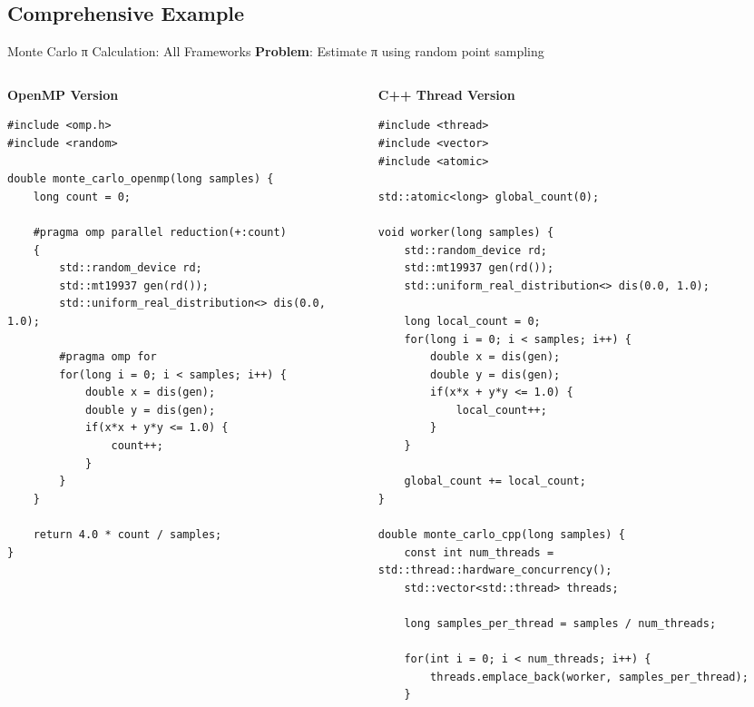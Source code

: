 \subsection{Comprehensive Example}
\begin{frame}[fragile]{ Monte Carlo π Calculation: All Frameworks}
	\textbf{Problem}: Estimate π using random point sampling

	\begin{columns}
		\begin{column}{0.3\textwidth}
			\textbf{OpenMP Version}
			\begin{verbatim}
#include <omp.h>
#include <random>

double monte_carlo_openmp(long samples) {
    long count = 0;

    #pragma omp parallel reduction(+:count)
    {
        std::random_device rd;
        std::mt19937 gen(rd());
        std::uniform_real_distribution<> dis(0.0, 1.0);

        #pragma omp for
        for(long i = 0; i < samples; i++) {
            double x = dis(gen);
            double y = dis(gen);
            if(x*x + y*y <= 1.0) {
                count++;
            }
        }
    }

    return 4.0 * count / samples;
}
			\end{verbatim}
		\end{column}
		\begin{column}{0.35\textwidth}
			\textbf{C++ Thread Version}
			\begin{verbatim}
#include <thread>
#include <vector>
#include <atomic>

std::atomic<long> global_count(0);

void worker(long samples) {
    std::random_device rd;
    std::mt19937 gen(rd());
    std::uniform_real_distribution<> dis(0.0, 1.0);

    long local_count = 0;
    for(long i = 0; i < samples; i++) {
        double x = dis(gen);
        double y = dis(gen);
        if(x*x + y*y <= 1.0) {
            local_count++;
        }
    }

    global_count += local_count;
}

double monte_carlo_cpp(long samples) {
    const int num_threads = std::thread::hardware_concurrency();
    std::vector<std::thread> threads;

    long samples_per_thread = samples / num_threads;

    for(int i = 0; i < num_threads; i++) {
        threads.emplace_back(worker, samples_per_thread);
    }


\end{verbatim}
\end{column}
\end{columns}
\end{frame}
